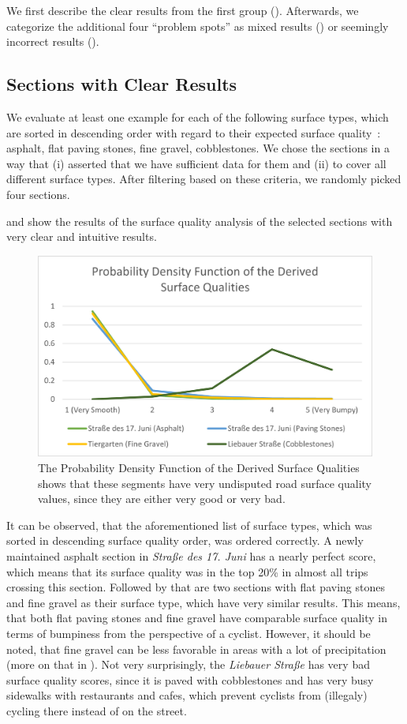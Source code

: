 We first describe the clear results from the first group ().
Afterwards, we categorize the additional four ``problem spots'' as mixed results () or seemingly incorrect results ().


\subsection{Sections with Clear Results}
\label{subsec:sections_with_clear_results}
We evaluate at least one example for each of the following surface types, which are sorted in descending order with regard to their expected surface quality~\cite{titov2019monitoring}: asphalt, flat paving stones, fine gravel, cobblestones.
We chose the sections in a way that (i) asserted that we have sufficient data for them and (ii) to cover all different surface types.
After filtering based on these criteria, we randomly picked four sections.

 and  show the results of the surface quality analysis of the selected sections with very clear and intuitive results.

\begin{figure}
    \centering
    \includegraphics[width=0.7\columnwidth]{fig/pdf_clear.png}
    \caption{%
        The Probability Density Function of the Derived Surface Qualities shows that these segments have very undisputed road surface quality values, since they are either very good or very bad.
    }%
    \label{fig:clear}
\end{figure}

It can be observed, that the aforementioned list of surface types, which was sorted in descending surface quality order, was ordered correctly.
A newly maintained asphalt section in \textit{Straße des 17. Juni} has a nearly perfect score, which means that its surface quality was in the top 20\% in almost all trips crossing this section.
Followed by that are two sections with flat paving stones and fine gravel as their surface type, which have very similar results.
This means, that both flat paving stones and fine gravel have comparable surface quality in terms of bumpiness from the perspective of a cyclist.
However, it should be noted, that fine gravel can be less favorable in areas with a lot of precipitation (more on that in ).
Not very surprisingly, the \textit{Liebauer Straße} has very bad surface quality scores, since it is paved with cobblestones and has very busy sidewalks with restaurants and cafes, which prevent cyclists from (illegaly) cycling there instead of on the street.

